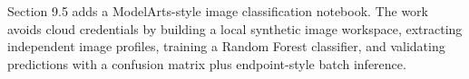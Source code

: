 Section 9.5 adds a ModelArts-style image classification notebook. The work avoids cloud credentials by building a local synthetic image workspace, extracting independent image profiles, training a Random Forest classifier, and validating predictions with a confusion matrix plus endpoint-style batch inference.
